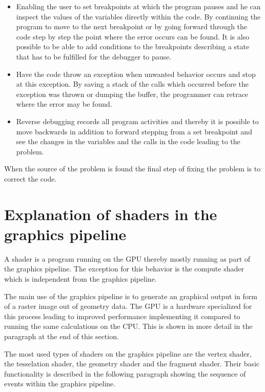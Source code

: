 \begin{itemize}

\item Enabling the user to set breakpoints at which the program pauses and he can inspect the values of the variables directly within the code. By continuing the program to move to the next breakpoint or by going forward through the code step by step the point where the error occurs can be found. It is also possible to be able to add conditions to the breakpoints describing a state that has to be fulfilled for the debugger to pause. 


\item Have the code throw an exception when unwanted behavior occurs and stop at this exception. By saving a stack of the calls which occurred before the exception was thrown or dumping the buffer, the programmer can retrace where the error may be found.


\item Reverse debugging records all program activities and thereby it is possible to move backwards in addition to forward stepping from a set breakpoint and see the changes in the variables and the calls in the code leading to the problem.

\end{itemize}

When the source of the problem is found the final step of fixing the problem is to correct the code.

\section{Explanation of shaders in the graphics pipeline}

A shader is a program running on the GPU thereby mostly running as part of the graphics pipeline. The exception for this behavior is the compute shader which is independent from the graphics pipeline.

The main use of the graphics pipeline is to generate an graphical output in form of a raster image out of geometry data. The GPU is a hardware specialized for this process leading to improved performance implementing it compared to running the same calculations on the CPU. This is shown in more detail in the paragraph at the end of this section.

The most used types of shaders on the graphics pipeline are the vertex shader, the tesselation shader, the geometry shader and the fragment shader. Their basic functionality is described in the following paragraph showing the sequence of events within the graphics pipeline.

